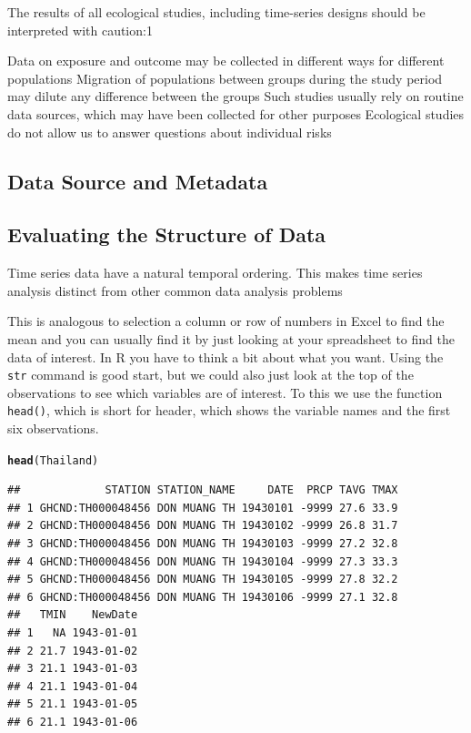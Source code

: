 \documentclass{article}\usepackage[]{graphicx}\usepackage[]{color}
\makeatletter
\newcommand{\hlstd}[1]{\textcolor[rgb]{0.345,0.345,0.345}{#1}}%
\newcommand{\hlkwd}[1]{\textcolor[rgb]{0.737,0.353,0.396}{\textbf{#1}}}%
\newenvironment{kframe}{%
 \def\at@end@of@kframe{}%
 \ifinner\ifhmode%
  \def\at@end@of@kframe{\end{minipage}}%
  \begin{minipage}{\columnwidth}%
 \fi\fi%
 \def\FrameCommand##1{\hskip\@totalleftmargin \hskip-\fboxsep
 \colorbox{shadecolor}{##1}\hskip-\fboxsep
     \hskip-\linewidth \hskip-\@totalleftmargin \hskip\columnwidth}%
 \MakeFramed {\advance\hsize-\width
   \@totalleftmargin\z@ \linewidth\hsize
   \@setminipage}}%
 {\par\unskip\endMakeFramed%
 \at@end@of@kframe}
\newenvironment{knitrout}{}{} %
\makeatother
\begin{document}
The results of all ecological studies, including time-series designs should be interpreted with caution:1

Data on exposure and outcome may be collected in different ways for different populations
Migration of populations between groups during the study period may dilute any difference between the groups
Such studies usually rely on routine data sources, which may have been collected for other purposes
Ecological studies do not allow us to answer questions about individual risks

\subsection{Data Source and Metadata}

\subsection{Evaluating the Structure of Data}

Time series data have a natural temporal ordering. This makes time series analysis distinct from other common data analysis problems

This is analogous to selection a column or row of numbers in Excel to find the mean and you can usually find it by just looking at your spreadsheet to find the data of interest. In R you have to think a bit about what you want. Using the \texttt{str} command is good start, but we could also just look at the top of the observations to see which variables are of interest. To this we use the function \texttt{head()}, which is short for header, which shows the variable names and the first six observations.

\begin{knitrout}
\color{fgcolor}\begin{kframe}
\begin{alltt}
\hlkwd{head}\hlstd{(Thailand)}
\end{alltt}
\begin{verbatim}
##             STATION STATION_NAME     DATE  PRCP TAVG TMAX
## 1 GHCND:TH000048456 DON MUANG TH 19430101 -9999 27.6 33.9
## 2 GHCND:TH000048456 DON MUANG TH 19430102 -9999 26.8 31.7
## 3 GHCND:TH000048456 DON MUANG TH 19430103 -9999 27.2 32.8
## 4 GHCND:TH000048456 DON MUANG TH 19430104 -9999 27.3 33.3
## 5 GHCND:TH000048456 DON MUANG TH 19430105 -9999 27.8 32.2
## 6 GHCND:TH000048456 DON MUANG TH 19430106 -9999 27.1 32.8
##   TMIN    NewDate
## 1   NA 1943-01-01
## 2 21.7 1943-01-02
## 3 21.1 1943-01-03
## 4 21.1 1943-01-04
## 5 21.1 1943-01-05
## 6 21.1 1943-01-06
\end{verbatim}
\end{kframe}
\end{knitrout}
\end{document}
